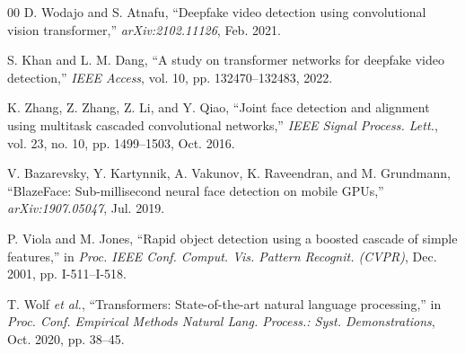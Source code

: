 \documentclass[conference]{IEEEtran}
\begin{document}
\begin{thebibliography}{00}
 D. Wodajo and S. Atnafu, ``Deepfake video detection using convolutional vision transformer,'' \textit{arXiv:2102.11126}, Feb. 2021.

 S. Khan and L. M. Dang, ``A study on transformer networks for deepfake video detection,'' \textit{IEEE Access}, vol. 10, pp. 132470--132483, 2022.

 K. Zhang, Z. Zhang, Z. Li, and Y. Qiao, ``Joint face detection and alignment using multitask cascaded convolutional networks,'' \textit{IEEE Signal Process. Lett.}, vol. 23, no. 10, pp. 1499--1503, Oct. 2016.

 V. Bazarevsky, Y. Kartynnik, A. Vakunov, K. Raveendran, and M. Grundmann, ``BlazeFace: Sub-millisecond neural face detection on mobile GPUs,'' \textit{arXiv:1907.05047}, Jul. 2019.

 P. Viola and M. Jones, ``Rapid object detection using a boosted cascade of simple features,'' in \textit{Proc. IEEE Conf. Comput. Vis. Pattern Recognit. (CVPR)}, Dec. 2001, pp. I-511--I-518.

 T. Wolf \textit{et al.}, ``Transformers: State-of-the-art natural language processing,'' in \textit{Proc. Conf. Empirical Methods Natural Lang. Process.: Syst. Demonstrations}, Oct. 2020, pp. 38--45.

\end{thebibliography}
\end{document}
